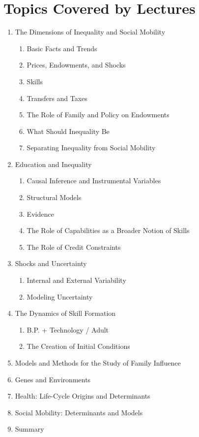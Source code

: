 \documentclass[12pt]{article}
\begin{document}
\section{Topics Covered by Lectures}
\begin{enumerate}
\item The Dimensions of Inequality and Social Mobility
\begin{enumerate}
\item Basic Facts and Trends
\item Prices, Endowments, and Shocks
\item Skills
\item Transfers and Taxes
\item The Role of Family and Policy on Endowments
\item What Should Inequality Be
\item Separating Inequality from Social Mobility
\end{enumerate}
\item Education and Inequality
\begin{enumerate}
\item Causal Inference and Instrumental Variables
\item Structural Models
\item Evidence
\item The Role of Capabilities as a Broader Notion of Skills
\item The Role of Credit Constraints
\end{enumerate}
\item Shocks and Uncertainty
\begin{enumerate}
\item Internal and External Variability
\item Modeling Uncertainty
\end{enumerate}
\item The Dynamics of Skill Formation
\begin{enumerate}
\item B.P. + Technology / Adult
\item The Creation of Initial Conditions
\end{enumerate}
\item Models and Methods for the Study of Family Influence
\item Genes and Environments
\item Health: Life-Cycle Origins and Determinants
\item Social Mobility: Determinants and Models
\item Summary
\end{enumerate}
\end{document}
